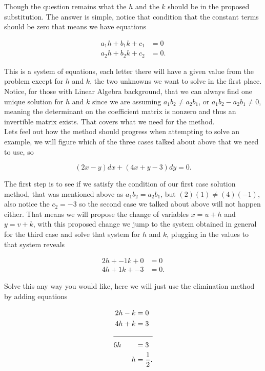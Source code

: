 \documentclass[12pt]{article}
\begin{document}
Though the question remains what the $h$ and the $k$ should be in the proposed substitution. The answer is simple, notice that condition that the constant terms should be zero that means we have equations

\begin{align*}
    a_1h+b_1k+c_1&=0 \\
    a_2h+b_2k+c_2&=0.
\end{align*}

This is a system of equations, each letter there will have a given value from the problem except for $h$ and $k$, the two unknowns we want to solve in the first place. Notice, for those with Linear Algebra background, that we can always find one unique solution for $h$ and $k$ since we are assuming $a_1b_2 \neq a_2b_1$, or $a_1b_2 - a_2b_1 \neq 0$, meaning the determinant on the coefficient matrix is nonzero and thus an invertible matrix exists. That covers what we need for the method. \\

Lets feel out how the method should progress when attempting to solve an example, we will figure which of the three cases talked about above that we need to use, so

\begin{equation*}
    (2x-y)dx+(4x+y-3)dy=0.
\end{equation*}

The first step is to see if we satisfy the condition of our first case solution method, that was mentioned above as $a_1b_2=a_2b_1$, but $(2)(1) \neq (4)(-1)$, also notice the $c_2=-3$ so the second case we talked about above will not happen either. That means we will propose the change of variables $x=u+h$ and $y=v+k$, with this proposed change we jump to the system obtained in general for the third case and solve that system for $h$ and $k$, plugging in the values to that system reveals

\begin{align*}
    2h+-1k+0&=0 \\
    4h+1k+-3&=0.
\end{align*}

Solve this any way you would like, here we will just use the elimination method by adding equations

\begin{align*}
    2h-k&=0 \\
    4h+k&=3 \\
    \cline{1-2}
    6h \qquad &= 3 \\
    h &=\frac{1}{2}.
\end{align*}
\end{document}
